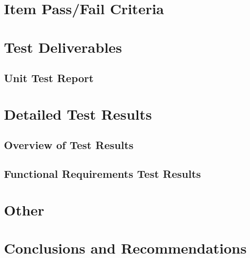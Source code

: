 \documentclass[11pt]{article}
\begin{document}
	\section{Item Pass/Fail Criteria}
	
	\section{Test Deliverables}
	
	\newpage
	
	\begin{center}
		\section*{Unit Test Report}
	\end{center}
	
	\section{Detailed Test Results}
	
		\subsection{Overview of Test Results}
		
		\subsection{Functional Requirements Test Results}
		
	\newpage	
		
	\section{Other}
	
	\section{Conclusions and Recommendations}
	
\end{document}
